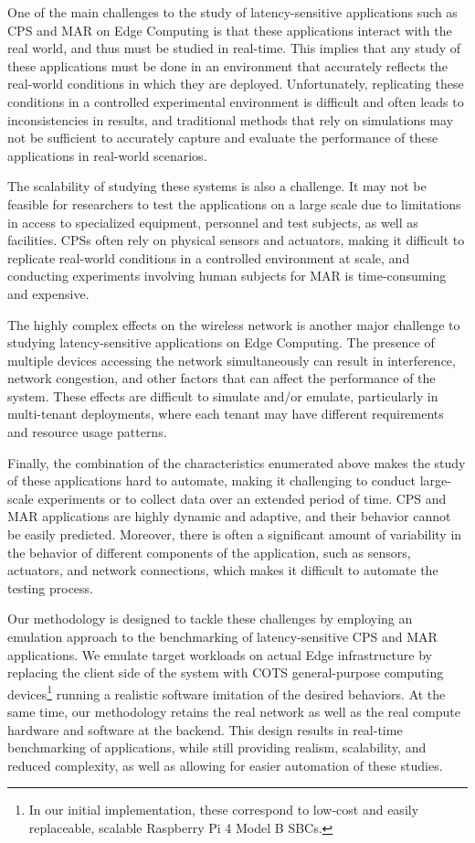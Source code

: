 One of the main challenges to the study of latency-sensitive applications such as \gls{CPS} and \gls{MAR} on Edge Computing is that these applications interact with the real world, and thus must be studied in real-time.
This implies that any study of these applications must be done in an environment that accurately reflects the real-world conditions in which they are deployed.
Unfortunately, replicating these conditions in a controlled experimental environment is difficult and often leads to inconsistencies in results, and traditional methods that rely on simulations may not be sufficient to accurately capture and evaluate the performance of these applications in real-world scenarios.

The scalability of studying these systems is also a challenge.
It may not be feasible for researchers to test the applications on a large scale due to limitations in access to specialized equipment, personnel and test subjects, as well as facilities.
\glspl{CPS} often rely on physical sensors and actuators, making it difficult to replicate real-world conditions in a controlled environment at scale, and conducting experiments involving human subjects for \gls{MAR} is time-consuming and expensive.

The highly complex effects on the wireless network is another major challenge to studying latency-sensitive applications on Edge Computing.
The presence of multiple devices accessing the network simultaneously can result in interference, network congestion, and other factors that can affect the performance of the system.
These effects are difficult to simulate and/or emulate, particularly in multi-tenant deployments, where each tenant may have different requirements and resource usage patterns.

Finally, the combination of the characteristics enumerated above makes the study of these applications hard to automate, making it challenging to conduct large-scale experiments or to collect data over an extended period of time.
\gls{CPS} and \gls{MAR} applications are highly dynamic and adaptive, and their behavior cannot be easily predicted.
Moreover, there is often a significant amount of variability in the behavior of different components of the application, such as sensors, actuators, and network connections, which makes it difficult to automate the testing process.

Our methodology is designed to tackle these challenges by employing an emulation approach to the benchmarking of latency-sensitive \gls{CPS} and \gls{MAR} applications. 
We emulate target workloads on actual Edge infrastructure by replacing the client side of the system with \gls{COTS} general-purpose computing devices\footnote{%
    In our initial implementation, these correspond to low-cost and easily replaceable, scalable Raspberry Pi 4 Model B \acsp{SBC}.
} running a realistic software imitation of the desired behaviors.
At the same time, our methodology retains the real network as well as the real compute hardware and software at the backend.
This design results in real-time benchmarking of applications, while still providing realism, scalability, and reduced complexity, as well as allowing for easier automation of these studies.

